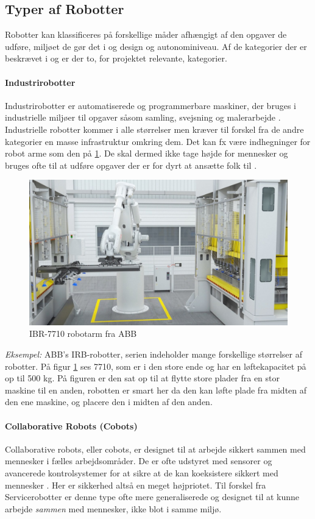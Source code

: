 \subsection{Typer af Robotter}

Robotter kan klassificeres på forskellige måder afhængigt af den opgaver de udføre, miljøet de gør det i og design og autonominiveau. Af de kategorier der er beskrævet i \cite{ISO2021ISOVocabulary} og \cite{IFR2023World2023} er der to, for projektet relevante, kategorier.

\paragraph{Industrirobotter} Industrirobotter er automatiserede og programmerbare maskiner, der bruges i industrielle miljøer til opgaver såsom samling, svejsning og malerarbejde \parencite{IFR2023World2023}. Industrielle robotter kommer i alle størrelser men kræver til forskel fra de andre kategorier en masse infrastruktur omkring dem. Det kan fx være indhegninger for robot arme som den på \ref{fig:irb7710pic}. De skal dermed ikke tage højde for mennesker og bruges ofte til at udføre opgaver der er for dyrt at ansætte folk til \parencite{ABB2023IRBSeries, ISO2021ISOVocabulary}. 

\begin{figure}[H]
    \centering
    \includegraphics[width=0.6
    \textwidth]{Sections/2 Problemanalyse/Media/irb7710.jpg}
    \caption{IBR-7710 robotarm fra ABB \parencite{ABB2023IRBSeries}}
    \label{fig:irb7710pic}
\end{figure}
\textit{Eksempel:} ABB's IRB-robotter, serien indeholder mange forskellige størrelser af robotter. På figur \ref{fig:irb7710pic} ses 7710, som er i den store ende og har en løftekapacitet på op til 500 \si{kg}. På figuren er den sat op til at flytte store plader fra en stor maskine til en anden, robotten er smart her da den kan løfte plade fra midten af den ene maskine, og placere den i midten af den anden.  


\paragraph{Collaborative Robots (Cobots)}
Collaborative robots, eller cobots, er designet til at arbejde sikkert sammen med mennesker i fælles arbejdsområder. De er ofte udstyret med sensorer og avancerede kontrolsystemer for at sikre at de kan koeksistere sikkert med mennesker \parencite{IFR2023World2023}. Her er sikkerhed altså en meget højpriotet. Til forskel fra Servicerobotter er denne type ofte mere generaliserede og designet til at kunne arbejde \textit{sammen} med mennesker, ikke blot i samme miljø.

